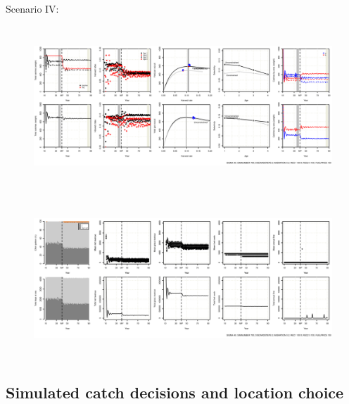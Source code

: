 \documentclass[12pt,oneline,a4paper,numbib]{ouparticle}
\begin{document}
\newpage
\begin{landscape}
Scenario IV:
\begin{figure}[!h]
\centering
\includegraphics[width=\textheight,height=6cm]{Figures/Catch_LO_nocompliance.eps}  
\caption{}
\label{fig:catch_lo}
\end{figure}

\begin{figure}[!h]
\centering
\includegraphics[width=\textheight,height=6cm]{Figures/Effort_LO_nocompliance.eps} 
\caption{}
\label{fig:effort_lo}
\end{figure}
\end{landscape}

\subsection{Simulated catch decisions and location choice}
\label{sec3.1}
\end{document}
